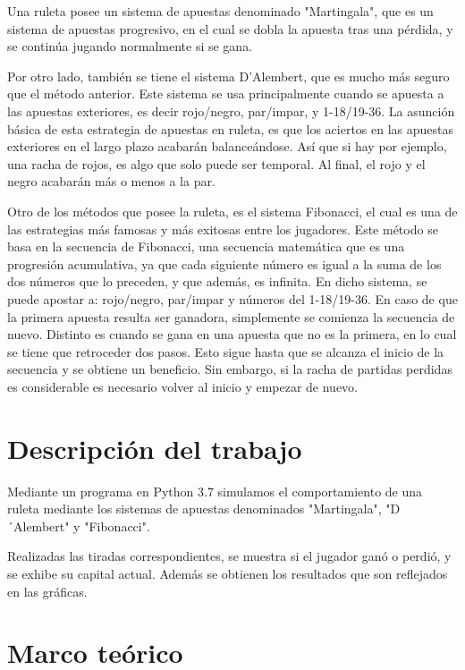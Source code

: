 \documentclass{article}
\begin{document}
    Una ruleta posee un sistema de apuestas denominado "Martingala", que es un sistema de apuestas progresivo,
    en el cual se dobla la apuesta tras una pérdida, y se continúa jugando normalmente si se gana.

    Por otro lado, también se tiene el sistema D'Alembert, que es mucho más seguro que el método anterior.
    Este sistema se usa principalmente cuando se apuesta a las apuestas exteriores,
    es decir rojo/negro, par/impar, y 1-18/19-36. La asunción básica de esta estrategia de apuestas en ruleta,
    es que los aciertos en las apuestas exteriores en el largo plazo acabarán balanceándose.
    Así que si hay por ejemplo, una racha de rojos, es algo que solo puede ser temporal.
    Al final, el rojo y el negro acabarán más o menos a la par.

    Otro de los métodos que posee la ruleta, es el sistema Fibonacci, el cual es una de las estrategias
    más famosas y más exitosas entre los jugadores. Este método se basa en la secuencia de Fibonacci,
    una secuencia matemática que es una progresión acumulativa,
    ya que cada siguiente número es igual a la suma de los dos números que lo preceden, y que además,
    es infinita. En dicho sistema, se puede apostar a: rojo/negro, par/impar y números del 1-18/19-36.
    En caso de que la primera apuesta resulta ser ganadora, simplemente se comienza la secuencia de nuevo.
    Distinto es cuando se gana en una apuesta que no es la primera, en lo cual se tiene que retroceder dos pasos.
    Esto sigue hasta que se alcanza el inicio de la secuencia y se obtiene un beneficio.
    Sin embargo, si la racha de partidas perdidas es considerable es necesario volver al inicio y
    empezar de nuevo.








    \section{Descripción del trabajo}
    \label{sec:headings}
    Mediante un programa en Python 3.7 simulamos el comportamiento de una ruleta mediante
    los sistemas de apuestas denominados "Martingala", "D´Alembert" y "Fibonacci".

    Realizadas las tiradas correspondientes, se muestra si el jugador ganó o perdió,
    y se exhibe su capital actual. Además se obtienen los resultados que son reflejados en las gráficas.

    \section{Marco teórico}
\end{document}
